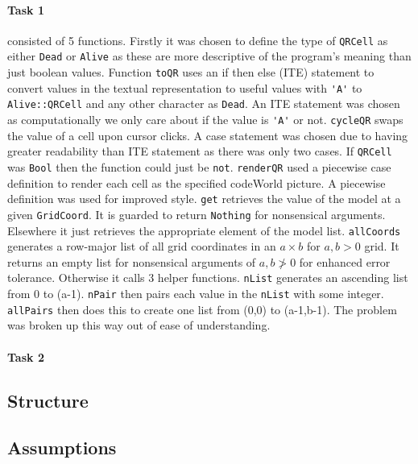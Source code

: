 \documentclass[11pt]{article}
\begin{document}
\paragraph{Task 1} consisted of 5 functions. Firstly it was chosen to define the type of \verb|QRCell| as either \verb|Dead| or \verb|Alive| as these are more descriptive of the program's meaning than just boolean values. Function \verb|toQR| uses an if then else (ITE) statement to convert values in the textual representation to useful values with \verb|'A'| to \verb| Alive::QRCell| and any other character as \verb|Dead|. An ITE statement was chosen as computationally we only care about if the value is \verb|'A'| or not. \verb|cycleQR| swaps the value of a cell upon cursor clicks. A case statement was chosen due to having greater readability than ITE statement as there was only two cases. If \verb|QRCell| was \verb|Bool| then the function could just be \verb|not|. \verb|renderQR| used a piecewise case definition to render each cell as the specified codeWorld picture. A piecewise definition was used for improved style. \verb|get| retrieves the value of the model at a given \verb|GridCoord|. It is guarded to return \verb|Nothing| for nonsensical arguments. Elsewhere it just retrieves the appropriate element of the model list. \verb|allCoords| generates a row-major list of all grid coordinates in an $a\times b$ for $a,b>0$ grid. It returns an empty list for nonsensical arguments of $a,b\not>0$ for enhanced error tolerance. Otherwise it calls 3 helper functions. \verb|nList| generates an ascending list from 0 to (a-1). \verb|nPair| then pairs each value in the \verb|nList| with some integer. \verb|allPairs| then does this to create one list from (0,0) to (a-1,b-1). The problem was broken up this way out of ease of understanding.
\paragraph{Task 2}


\subsection{Structure}



 \subsection{Assumptions}%
\end{document}
